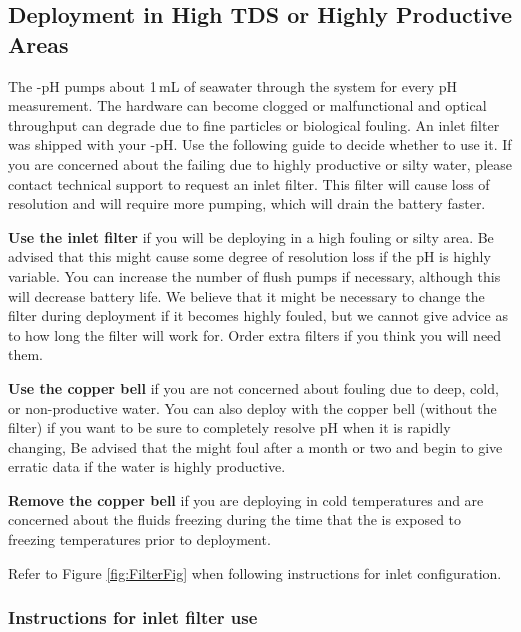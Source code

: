 \or		%

\subsection{Deployment in High TDS or Highly Productive Areas}

The \instType{}-pH pumps about 1\,mL of seawater through the system for every pH measurement.  The hardware can become clogged or malfunctional and optical throughput can degrade due to fine particles or biological fouling.  An inlet filter was shipped with your \instType{}-pH.  Use the following guide to decide whether to use it.  If you are concerned about the \instType{} failing due to highly productive or silty water, please contact technical support to request an inlet filter.  This filter will cause loss of resolution and will require more pumping, which will drain the battery faster.

\textbf{Use the inlet filter} if you will be deploying in a high fouling or silty area.  Be advised that this might cause some degree of resolution loss if the pH is highly variable.  You can increase the number of flush pumps if necessary, although this will decrease battery life.  We believe that it might be necessary to change the filter during deployment if it becomes highly fouled, but we cannot give advice as to how long the filter will work for.  Order extra filters if you think you will need them.

\textbf{Use the copper bell} if you are not concerned about fouling due to deep, cold, or non-productive water.  You can also deploy with the copper bell (without the filter) if you want to be sure to completely resolve pH when it is rapidly changing,  Be advised that the \instType{} might foul after a month or two and begin to give erratic data if the water is highly productive.

\textbf{Remove the copper bell} if you are deploying in cold temperatures and are concerned about the \instType{} fluids freezing during the time that the \instType{} is exposed to freezing temperatures prior to deployment.

Refer to Figure \ref{fig:FilterFig}  when following instructions for \instType{} inlet configuration.


\subsubsection{Instructions for inlet filter use}

